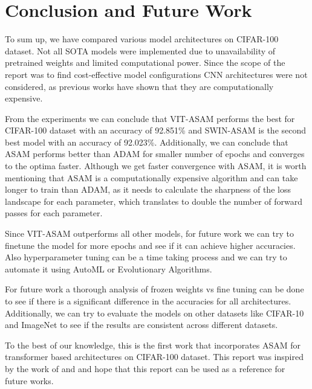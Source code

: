 \documentclass{article}
\begin{document}
\section{Conclusion and Future Work}
To sum up, we have compared various model architectures on CIFAR-100 dataset.
Not all SOTA models were implemented due to unavailability of pretrained weights and limited computational power.
Since the scope of the report was to find cost-effective model configurations CNN architectures were not considered, as previous works have shown that they are computationally expensive.

From the experiments we can conclude that VIT-ASAM performs the best for CIFAR-100 dataset with an accuracy of 92.851\% and SWIN-ASAM is the second best model with an accuracy of 92.023\%.
Additionally, we can conclude that ASAM performs better than ADAM for smaller number of epochs and converges to the optima faster.
Although we get faster convergence with ASAM, it is worth mentioning that ASAM is a computationally expensive algorithm and can take longer to train than ADAM, as it needs to calculate the sharpness of the loss landscape for each parameter, which translates to double the number of forward passes for each parameter.

Since VIT-ASAM outperforms all other models, for future work we can try to finetune the model for more epochs and see if it can achieve higher accuracies.
Also hyperparameter tuning can be a time taking process and we can try to automate it using AutoML or Evolutionary Algorithms.

For future work a thorough analysis of frozen weights vs fine tuning can be done to see if there is a significant difference in the accuracies for all architectures.
Additionally, we can try to evaluate the models on other datasets like CIFAR-10 and ImageNet to see if the results are consistent across different datasets.

To the best of our knowledge, this is the first work that incorporates ASAM for transformer based architectures on CIFAR-100 dataset.
This report was inspired by the work of \cite{DBLP:journals/corr/abs-2102-11600} and \cite{DBLP:journals/corr/abs-2103-14030} and hope that this report can be used as a reference for future works.


\nocite{*}




\end{document}
